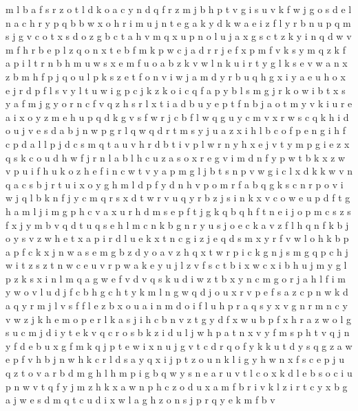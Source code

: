 \documentclass{article}
\begin{document}
m
l b a f s
r z o t l d
k o a c y n d q f r z m j b h p t v g i s u
v k f w j g o s d e l n a c h r y p q b
b w x o h r i m u j n t e g a k y
d k w a e i z f l y r b n u p q m s j g v c o t x
s d o z g b c t a h v m q x u p n
o l u j a x g s c t z k y i n q d w v m f h r b e p
l z q o n x t e b f m k p w c j a d r
r j e f x p m
f v k s y m
q z k f a p i l t r n b h m u w s x e
m f u o a b z k v w l n
k u
i r t y g l k s e v w a n x z b m h f p j q o u
l p k s z e t f o n v i w j a m d y r b u q h g x
i y a e u h o x
e j r d p f l s v
y l t u w i g p c j k z
k o i
c
q f a p y b l s m g j r k o w i
b t x s y a f m j g
y o r
n c f v q z h s r l x t i a d b u y e p
t
f n b j a o t m y v k i u r e
a i x o y z m e h u p q d k g v s f w r j c b
f l w q g u y c m v
x r w s c q k h i d o u j v
e s d a b j n w p g r l q
w q d r t m s y j u a z x i h l b c o f p e n g
i h f c p d a l
l p j d c s m q t a u v h r
d b t i v p l w r n y h x e j
v t y m p g i e z x q s k c o u d h w f j r n l a b
l h c u z a s o x r e g v i m d n f y p w t b k
x z w v p u i f h
u k o z h e f i n c w t v y a p m g l j b
t
s n p v w g i c l x d k
k w v n q a c s b j r t u i x o y g h m l d p f
y d n h v p o m r f a b q g k s c
n r
p o v i w j q
l b k n f j y c m q r s x d t w
r v u
q y r b z j s i n k x v c o w e u p d f t g h a m l
j i m g p h
c v a x u r h d m s e p f t j g k q b
q h f t n e i j o p m c s
z s f x j y m b v q d t u
q s e h l m c n k
b g n r y u s j o e c k a v z f l h
q n f k b j o y s v z w h e t x a p i r d l u
e k x
t n c g i z j e q d s m x y r f v w l o h k b p a
p f c k x j n w a s e m g b z
d y o a v z h q x t w r p i c k g n j s m
g q p c h j w i t z s
z t n w c e u v r
p w a k e y u j l z v f s c t b i x
w c x i b h u j m y g l p z k
s x i n l m q a g w e f v d
v q s k u d i w z t b x y n c m g o r j a h l f
i m y w o v l u d j f c b h g
c h t y k m l n g w q d j o u x r v p e f s a
z c p n w k d a q y r m j l v s f
f l e z b x o u a i n m d
o i f l u h p r a q s y x v g n
r m n c y v w z j k h e
m o p e r l k a s j i h c b n v z t g y d f x w u
b p f x h r a z w o l g s u c m j d i y t e k v q
c r o s b k z i d u l j w h p a t n x v y f
m s p h t v q j n y f d e b u
x g f m k q j p t e
w i x n u j g v t c d r q o f y k
k u t d y s q g z a w e p f v h b j
n w h k c r l d s a y q x i j p t z o u
n
k l i g y h w n x f s c e p j u q z t o v a r b d m
g h l
h m p i g b q w y s n e a r u v t l c o x k
d l e b s o c i u p n w v t q f y j m z h k x a
w n p h c z o d u x a m f b r i
v k l z i r t c y x b g a j w e s d m q
t c u d i x w l a g h z o n s j p r q y e k m f b v
\end{document}
